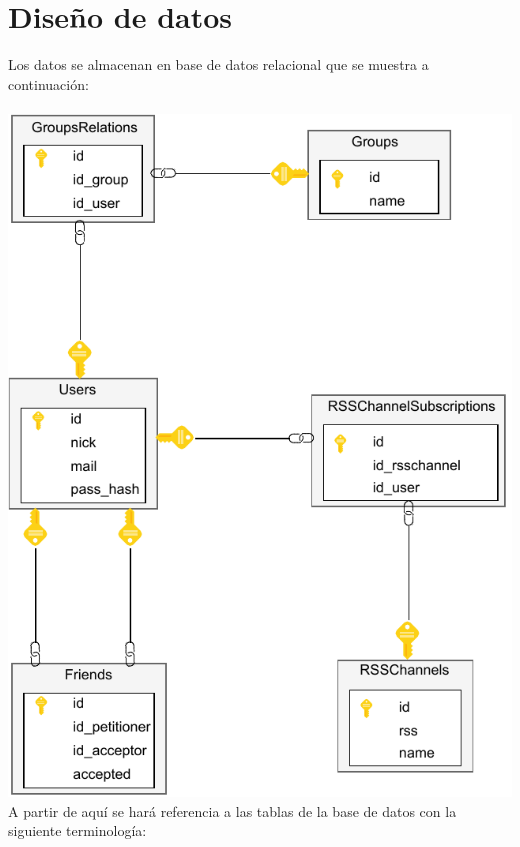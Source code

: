 \documentclass[12pt, a4paper]{book} %
\begin{document}
		\section{Diseño de datos}
		Los datos se almacenan en base de datos relacional que se muestra a continuación:\\\\
		\includegraphics[width=\textwidth,height=\textheight, keepaspectratio]{img/DataDiagram.pdf}\\
		A partir de aquí se hará referencia a las tablas de la base de datos con la siguiente terminología:
\end{document}
